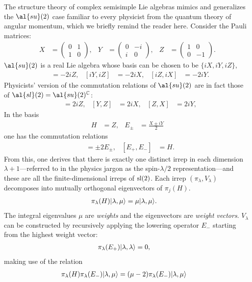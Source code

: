 The structure theory of complex semisimple Lie algebras mimics and generalizes the $\al{su}(2)$ case familiar to every physicist from the quantum theory of angular momentum, which we briefly remind the reader here. Consider the Pauli matrices:
\begin{align}
X & =\left(\begin{array}{cc}
0 & 1\\
1 & 0
\end{array}\right),&
Y & =\left(\begin{array}{cc}
0 & -i\\
i & 0
\end{array}\right),&
Z & =\left(\begin{array}{cc}
1 & 0\\
0 & -1
\end{array}\right).
\end{align}
$\al{su}(2)$ is a real Lie algebra whose basis can be chosen to be $\{ iX,iY,iZ \}$,
\begin{align}
[iX,iY] &= -2iZ,&
[iY,iZ] &= -2iX,&
[iZ,iX] &= -2iY.
\end{align}
Physicists' version of the commutation relations of $\al{su}(2)$ are in fact those of $\al{sl}(2) = \al{su}(2)^{\mathbb{C}}$:
\begin{align}
[X,Y] & =2iZ,&
[Y,Z] & =2iX,&
[Z,X] & =2iY,
\end{align}
In the basis
\begin{align}
H & =Z,&
E_{\pm} & =\frac{X \pm iY}{2}
\end{align}
one has the commutation relations
\begin{align}
[H,E_{\pm}] &= \pm 2E_{\pm},&
[E_+,E_-] & =H.
\end{align}
From this, one derives that there is exactly one distinct irrep in each dimension $\lambda+1$---referred to in the physics jargon as the spin-$\lambda/2$ representation---and these are all the finite-dimensional irreps of $\text{sl}(2)$. Each irrep $(\pi_{\lambda},V_{\lambda})$ decomposes into mutually orthogonal eigenvectors of $\pi_j(H)$.
\begin{align}
\pi_{\lambda}(H) {\left\vert{\lambda,\mu}\right\rangle} &= \mu {\left\vert{\lambda,\mu}\right\rangle}.
\end{align}
The integral eigenvalues $\mu$ are \emph{weights} and the eigenvectors are \emph{weight vectors}. $V_{\lambda}$ can be constructed by recursively applying the lowering operator $E_-$ starting from the highest weight vector:
\begin{align}
\pi_{\lambda}(E_+) {\left\vert{\lambda,\lambda}\right\rangle} &= 0,
\end{align}
making use of the relation
\begin{align}
\pi_{\lambda}(H) \pi_{\lambda}(E_-) \ket{\lambda,\mu} &= (\mu - 2)\pi_{\lambda}(E_-) \ket{\lambda,\mu} %
\end{align}

